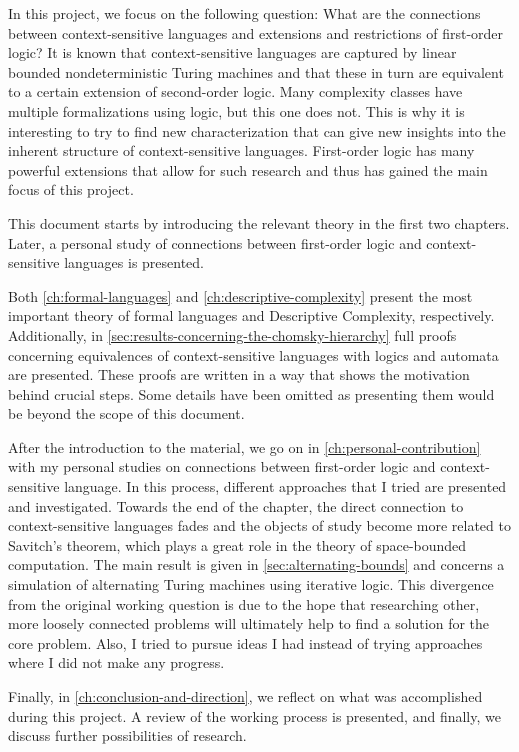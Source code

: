 In this project, we focus on the following question: What are the connections between context-sensitive languages and extensions and restrictions of first-order logic?
It is known that context-sensitive languages are captured by linear bounded nondeterministic Turing machines and that these in turn are equivalent to a certain extension of second-order logic.
Many complexity classes have multiple formalizations using logic, but this one does not.
This is why it is interesting to try to find new characterization that can give new insights into the inherent structure of context-sensitive languages.
First-order logic has many powerful extensions that allow for such research and thus has gained the main focus of this project.

This document starts by introducing the relevant theory in the first two chapters.
Later, a personal study of connections between first-order logic and context-sensitive languages is presented.

Both \cref{ch:formal-languages} and \cref{ch:descriptive-complexity} present the most important theory of formal languages and Descriptive Complexity, respectively.
Additionally, in \cref{sec:results-concerning-the-chomsky-hierarchy} full proofs concerning equivalences of context-sensitive languages with logics and automata are presented.
These proofs are written in a way that shows the motivation behind crucial steps.
Some details have been omitted as presenting them would be beyond the scope of this document.

After the introduction to the material, we go on in \cref{ch:personal-contribution} with my personal studies on connections between first-order logic and context-sensitive language.
In this process, different approaches that I tried are presented and investigated.
Towards the end of the chapter, the direct connection to context-sensitive languages fades and the objects of study become more related to Savitch's theorem, which plays a great role in the theory of space-bounded computation.
The main result is given in \cref{sec:alternating-bounds} and concerns a simulation of alternating Turing machines using iterative logic.
This divergence from the original working question is due to the hope that researching other, more loosely connected problems will ultimately help to find a solution for the core problem.
Also, I tried to pursue ideas I had instead of trying approaches where I did not make any progress.

Finally, in \cref{ch:conclusion-and-direction}, we reflect on what was accomplished during this project.
A review of the working process is presented, and finally, we discuss further possibilities of research.


